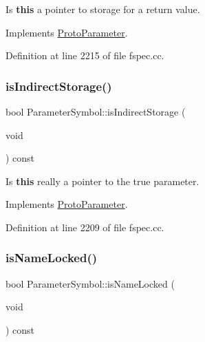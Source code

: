 Is {\bfseries{this}} a pointer to storage for a return value. 



Implements \mbox{\hyperlink{class_proto_parameter_a104c1c7a9873fafe0394d23bb35feeb4}{Proto\+Parameter}}.



Definition at line 2215 of file fspec.\+cc.

\mbox{\label{class_parameter_symbol_a664deaea278dd7353fe391f94233cfd0}} 
\subsubsection{\texorpdfstring{isIndirectStorage()}{isIndirectStorage()}}
{\footnotesize\ttfamily bool Parameter\+Symbol\+::is\+Indirect\+Storage (\begin{DoxyParamCaption}\item[{void}]{ }\end{DoxyParamCaption}) const\hspace{0.3cm}{\ttfamily [virtual]}}



Is {\bfseries{this}} really a pointer to the true parameter. 



Implements \mbox{\hyperlink{class_proto_parameter_a07008f520e34c236298de7f652c22657}{Proto\+Parameter}}.



Definition at line 2209 of file fspec.\+cc.

\mbox{\label{class_parameter_symbol_aeadfb7be82e97a45d3f7bc661ce09bea}} 
\subsubsection{\texorpdfstring{isNameLocked()}{isNameLocked()}}
{\footnotesize\ttfamily bool Parameter\+Symbol\+::is\+Name\+Locked (\begin{DoxyParamCaption}\item[{void}]{ }\end{DoxyParamCaption}) const\hspace{0.3cm}{\ttfamily [virtual]}}



